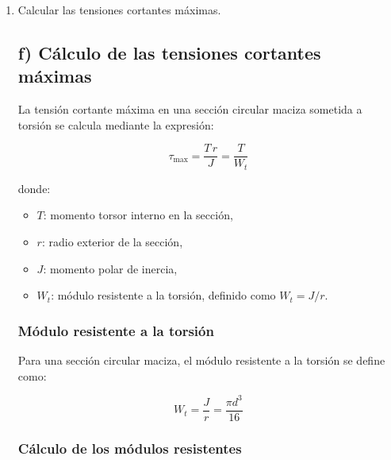\documentclass[12pt,a4paper]{article}
\begin{document}
\begin{enumerate}
Despejando:

\begin{equation}
x-1.2=\frac{3.538\times 10^{-3}}{0.03134}=0.1129\ \text{m}
\end{equation}

\begin{equation}
x \approx 1.3129\ \text{m}
\end{equation}

Este resultado indica que el punto de giro nulo se encuentra dentro del tramo B--C, a una distancia aproximada de $0.113$ m a la derecha del punto B. Esto confirma que el efecto torsional negativo del segundo tramo supera al giro positivo acumulado en el tramo A--B.

\item[f)] Calcular las tensiones cortantes máximas.

\subsection*{f) Cálculo de las tensiones cortantes máximas}

La tensión cortante máxima en una sección circular maciza sometida a torsión se calcula mediante la expresión:

\begin{equation}
\tau_{\max}=\frac{T\,r}{J}=\frac{T}{W_t}
\end{equation}

donde:
\begin{itemize}
    \item $T$: momento torsor interno en la sección,
    \item $r$: radio exterior de la sección,
    \item $J$: momento polar de inercia,
    \item $W_t$: módulo resistente a la torsión, definido como $W_t=J/r$.
\end{itemize}

\subsubsection*{Módulo resistente a la torsión}

Para una sección circular maciza, el módulo resistente a la torsión se define como:

\begin{equation}
W_t=\frac{J}{r}=\frac{\pi d^3}{16}
\end{equation}

\subsubsection*{Cálculo de los módulos resistentes}


\end{enumerate}
\end{document}
